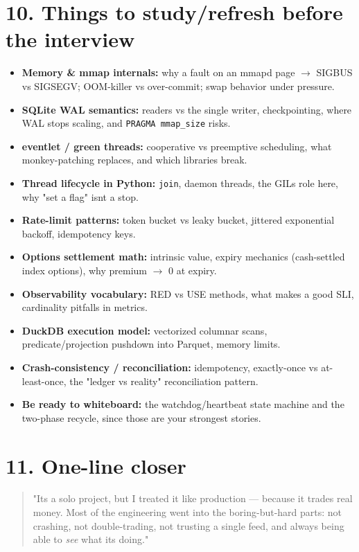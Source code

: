 \documentclass[11pt]{article}
\providecommand{\tightlist}{\setlength{\itemsep}{1pt}\setlength{\parskip}{0pt}}
\begin{document}
\section{10. Things to study/refresh before the interview}\label{10-things-to-studyrefresh-before-the-interview}

\begin{itemize}
\tightlist
\item
  \textbf{Memory \& mmap internals:} why a fault on an mmap\textquotesingle d page \(\rightarrow\) SIGBUS vs SIGSEGV; OOM-killer vs over-commit; swap behavior under pressure.
\item
  \textbf{SQLite WAL semantics:} readers vs the single writer, checkpointing, where WAL stops scaling, and \texttt{PRAGMA\ mmap\_size} risks.
\item
  \textbf{eventlet / green threads:} cooperative vs preemptive scheduling, what monkey-patching replaces, and which libraries break.
\item
  \textbf{Thread lifecycle in Python:} \texttt{join}, daemon threads, the GIL\textquotesingle s role here, why "set a flag" isn\textquotesingle t a stop.
\item
  \textbf{Rate-limit patterns:} token bucket vs leaky bucket, jittered exponential backoff, idempotency keys.
\item
  \textbf{Options settlement math:} intrinsic value, expiry mechanics (cash-settled index options), why premium \(\rightarrow\) 0 at expiry.
\item
  \textbf{Observability vocabulary:} RED vs USE methods, what makes a good SLI, cardinality pitfalls in metrics.
\item
  \textbf{DuckDB execution model:} vectorized columnar scans, predicate/projection pushdown into Parquet, memory limits.
\item
  \textbf{Crash-consistency / reconciliation:} idempotency, exactly-once vs at-least-once, the "ledger vs reality" reconciliation pattern.
\item
  \textbf{Be ready to whiteboard:} the watchdog/heartbeat state machine and the two-phase recycle, since those are your strongest stories.
\end{itemize}

\section{11. One-line closer}\label{11-one-line-closer}

\begin{quote}
"It\textquotesingle s a solo project, but I treated it like production --- because it trades real money. Most of
the engineering went into the boring-but-hard parts: not crashing, not double-trading, not
trusting a single feed, and always being able to \emph{see} what it\textquotesingle s doing."
\end{quote}
\end{document}
